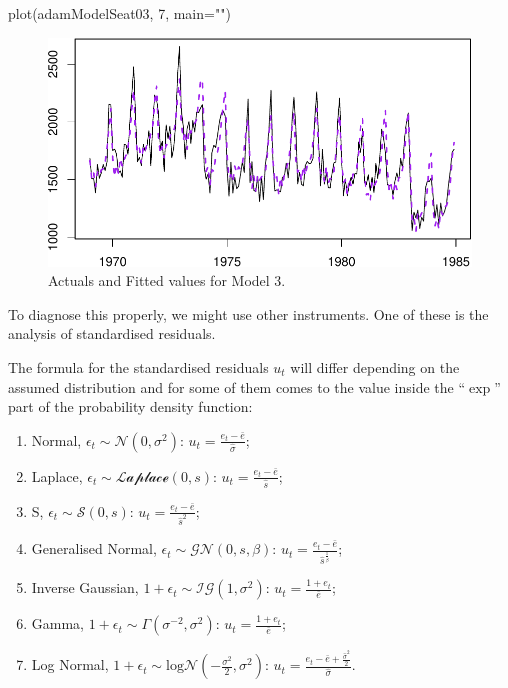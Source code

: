 \documentclass[
]{book}
\newenvironment{Shaded}{\begin{snugshade}}{\end{snugshade}}
\newcommand{\AttributeTok}[1]{\textcolor[rgb]{0.77,0.63,0.00}{#1}}
\newcommand{\DecValTok}[1]{\textcolor[rgb]{0.00,0.00,0.81}{#1}}
\newcommand{\FunctionTok}[1]{\textcolor[rgb]{0.00,0.00,0.00}{#1}}
\newcommand{\NormalTok}[1]{#1}
\newcommand{\StringTok}[1]{\textcolor[rgb]{0.31,0.60,0.02}{#1}}
\providecommand{\tightlist}{%
  \setlength{\itemsep}{0pt}\setlength{\parskip}{0pt}}
\theoremstyle{definition}
\theoremstyle{definition}
\theoremstyle{definition}
\theoremstyle{definition}
\theoremstyle{remark}
\begin{document}
\begin{Shaded}
\begin{Highlighting}[]
\FunctionTok{plot}\NormalTok{(adamModelSeat03, }\DecValTok{7}\NormalTok{, }\AttributeTok{main=}\StringTok{""}\NormalTok{)}
\end{Highlighting}
\end{Shaded}

\begin{figure}
\centering
\includegraphics{Svetunkov--2022----ADAM_files/figure-latex/adamModelSeat03LinearPlot-1.pdf}
\caption{\label{fig:adamModelSeat03LinearPlot}Actuals and Fitted values for Model 3.}
\end{figure}

To diagnose this properly, we might use other instruments. One of these is the analysis of standardised residuals.

The formula for the standardised residuals \(u_t\) will differ depending on the assumed distribution and for some of them comes to the value inside the ``\(\exp\)'' part of the probability density function:

\begin{enumerate}
\def\labelenumi{\arabic{enumi}.}
\tightlist
\item
  Normal, \(\epsilon_t \sim \mathcal{N}(0, \sigma^2)\): \(u_t = \frac{e_t -\bar{e}}{\hat{\sigma}}\);
\item
  Laplace, \(\epsilon_t \sim \mathcal{Laplace}(0, s)\): \(u_t = \frac{e_t -\bar{e}}{\hat{s}}\);
\item
  S, \(\epsilon_t \sim \mathcal{S}(0, s)\): \(u_t = \frac{e_t -\bar{e}}{\hat{s}^2}\);
\item
  Generalised Normal, \(\epsilon_t \sim \mathcal{GN}(0, s, \beta)\): \(u_t = \frac{e_t -\bar{e}}{\hat{s}^{\frac{1}{\beta}}}\);
\item
  Inverse Gaussian, \(1+\epsilon_t \sim \mathcal{IG}(1, \sigma^2)\): \(u_t = \frac{1+e_t}{\bar{e}}\);
\item
  Gamma, \(1+\epsilon_t \sim \mathcal{\Gamma}(\sigma^{-2}, \sigma^2)\): \(u_t = \frac{1+e_t}{\bar{e}}\);
\item
  Log Normal, \(1+\epsilon_t \sim \mathrm{log}\mathcal{N}\left(-\frac{\sigma^2}{2}, \sigma^2\right)\): \(u_t = \frac{e_t -\bar{e} +\frac{\hat{\sigma}^2}{2}}{\hat{\sigma}}\).
\end{enumerate}
\end{document}
